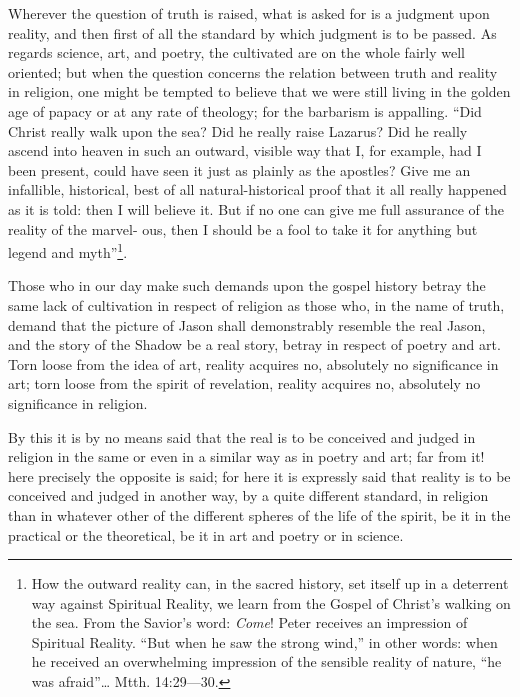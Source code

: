 \documentclass[12pt,a4paper,openany]{book}
\newcommand{\opage}[1]{\marginnote{\footnotesize\textit{[#1]}}}
\begin{document}
Wherever the question of truth is raised, what is asked for
is a judgment upon reality, and then first of all
the standard by which judgment is to be passed. As regards science,
art, and poetry, the cultivated are on the
whole fairly well oriented; but when the
question concerns the relation between truth and reality
in religion, one might be tempted to believe that we
were still living in the golden age of papacy or at any rate of theology;
for the barbarism is appalling. ``Did Christ
really walk upon the sea? Did he really raise
Lazarus? Did he really ascend into heaven in such an
outward, visible way that I, for example, had I
been present, could have seen it just as plainly
as the apostles? Give me an infallible, historical,
best of all natural-historical proof that it all
really happened as it is told:
then I will believe it. But if no one can give
me full assurance of the reality of the marvel-
\setcounter{footnote}{0}%
\opage{296}ous, then I should be a fool to take it
for anything but legend and myth''\footnote[1]{How the outward reality can, in the sacred history, set itself up in a deterrent way against Spiritual Reality, we learn from the Gospel of Christ's walking on the sea. From the Savior's word: \emph{Come}! Peter receives an impression of Spiritual Reality. ``But when he saw the strong wind,'' in other words: when he received an overwhelming impression of the sensible reality of nature, ``he was afraid''\dots{} Mtth. 14:29—30.}.

Those who in our day make such demands upon the
gospel history betray the same lack of cultivation
in respect of religion as those who, in the name of truth,
demand that the picture of Jason shall demonstrably resemble
the real Jason, and the story of the Shadow be a
real story, betray in respect of poetry and art.
Torn loose from the idea of art, reality acquires no,
absolutely no significance in art; torn loose from the spirit
of revelation, reality acquires no, absolutely no significance
in religion.

By this it is by no means said that the real is to be conceived
and judged in religion in the same or even in a
similar way as in poetry and art; far
from it! here precisely the opposite is said; for here it is expressly said
that reality is to be conceived and judged in
another way, by a quite different standard, in
religion than in whatever other of the different
spheres of the life of the spirit, be it in the practical
or the theoretical, be it in art and poetry or in
science.
\end{document}
